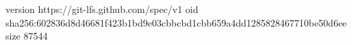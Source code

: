 version https://git-lfs.github.com/spec/v1
oid sha256:602836d8d46681f423b1bd9e03cbbcbd1cbb659a4dd1285828467710be50d6ee
size 87544
